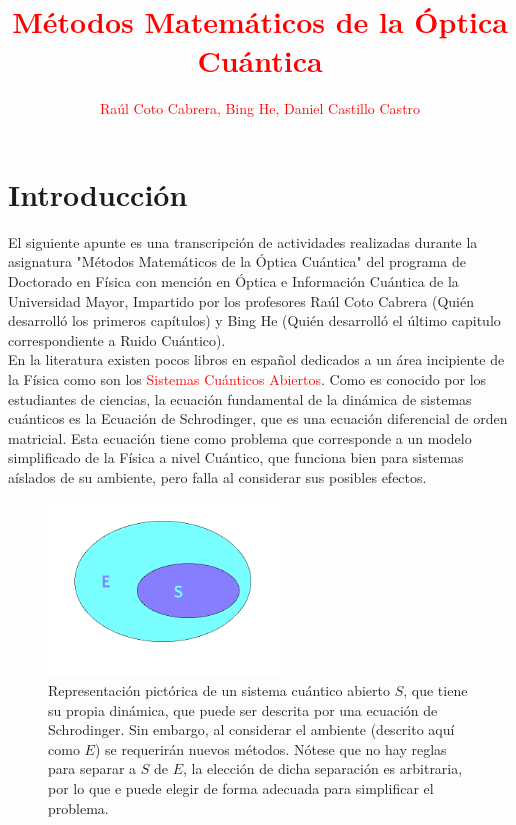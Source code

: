 \documentclass{book}
\begin{document}
\author{\textcolor{Red}{Raúl Coto Cabrera, Bing He, Daniel Castillo Castro}}
\title{\textcolor{Red}{Métodos Matemáticos de la Óptica Cuántica}}
\vspace{0.05in}
\chapterfont{\color{Red}}
\sectionfont{\color{Red}}
\subsectionfont{\color{Red}}
\everymath{\color{blue}}
\everydisplay{\color{blue}}
\maketitle
\tableofcontents
\chapter{Introducción}
El siguiente apunte es una transcripción de actividades realizadas durante la asignatura "Métodos Matemáticos de la Óptica Cuántica" del programa de Doctorado en Física con mención en Óptica e Información Cuántica de la Universidad Mayor, Impartido por los profesores Raúl Coto Cabrera (Quién desarrolló los primeros capítulos) y Bing He (Quién desarrolló el último capitulo correspondiente a Ruido Cuántico). \\


En la literatura existen pocos libros en español dedicados a un área incipiente de la Física como son los \textcolor{red}{Sistemas Cuánticos Abiertos}. Como es conocido por los estudiantes de ciencias, la ecuación fundamental de la dinámica de sistemas cuánticos es la Ecuación de Schrodinger, que es una ecuación diferencial de orden matricial. Esta ecuación tiene como problema que corresponde a un modelo simplificado de la Física a nivel Cuántico, que funciona bien para sistemas aíslados de su ambiente, pero falla al considerar sus posibles efectos.\\


\begin{figure}[ht]
\centering
\includegraphics[width=0.55\textwidth]{qos.png}
\caption{Representación pictórica de un sistema cuántico abierto $S$, que tiene su propia dinámica, que puede ser descrita por una ecuación de Schrodinger. Sin embargo, al considerar el ambiente (descrito aquí como $E$) se requerirán nuevos métodos. Nótese que no hay reglas para separar a $S$ de $E$, la elección de dicha separación es arbitraria, por lo que e puede elegir de forma adecuada para simplificar el problema.}
\end{figure}
\end{document}
